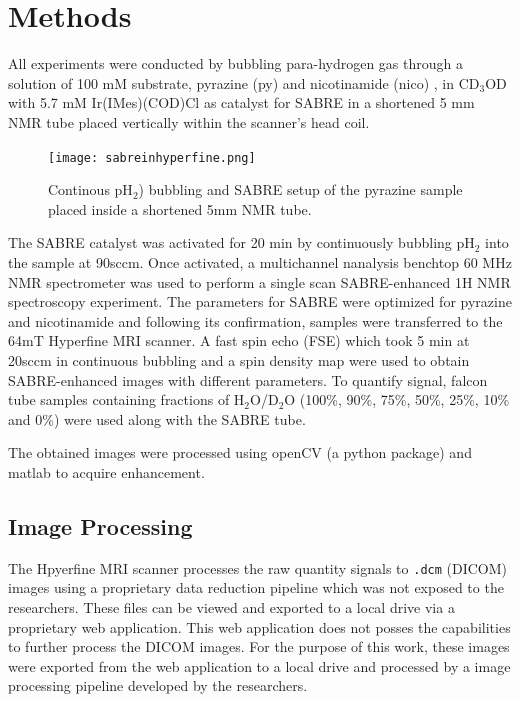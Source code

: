\documentclass[final,3p,times,twocolumn]{elsarticle}
\begin{document}
\section{Methods}
All experiments were conducted by bubbling para-hydrogen gas through a solution of 100 mM substrate, pyrazine (py) and nicotinamide (nico) , in CD$_{\mathrm{3}}$OD with 5.7 mM
Ir(IMes)(COD)Cl as catalyst for SABRE in a shortened 5 mm NMR tube placed vertically within the scanner’s head coil. 
\begin{figure}
    \centering
    \texttt{[image: sabreinhyperfine.png]}
    \caption{Continous pH$_{\mathrm{2}}$) bubbling and SABRE setup of the pyrazine sample placed inside a shortened 5mm NMR tube.}
    \label{fig:my_label}
\end{figure}

The SABRE catalyst was activated for 20 min by continuously bubbling pH$_{\mathrm{2}}$ into the sample at 90sccm. Once activated, a multichannel nanalysis benchtop 60 MHz NMR spectrometer was used to perform a single scan SABRE-enhanced 1H NMR spectroscopy experiment. The parameters for SABRE were optimized for pyrazine and nicotinamide and following its confirmation, samples were transferred to the 64mT Hyperfine MRI scanner. 
A fast spin echo (FSE) which took 5 min at 20sccm in continuous bubbling and a spin density map were used to obtain SABRE-enhanced images with different parameters. To quantify signal, falcon tube samples containing fractions of H$_{\mathrm{2}}$O/D$_{\mathrm{2}}$O (100\%, 90\%, 75\%, 50\%, 25\%, 10\% and 0\%) were used along with the SABRE tube. \par The obtained images were processed using openCV\cite{opencv_library} (a python package) and matlab to acquire enhancement.

\subsection{Image Processing}

The Hpyerfine  MRI scanner processes the raw quantity signals to \texttt{.dcm} (DICOM) images using a proprietary data reduction pipeline which was not exposed to the researchers. These files can be viewed and exported to a local drive via a proprietary web application. This web application does not posses the capabilities to further process the DICOM images. For the purpose of this work, these images were exported from the web application to a local drive and processed by a image processing pipeline developed by the researchers. 
\end{document}
